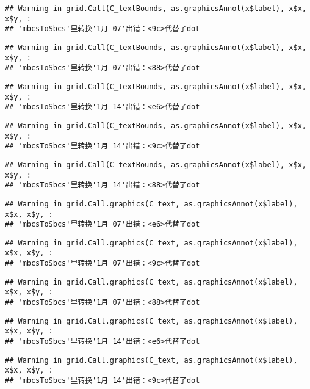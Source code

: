 \documentclass[
]{article}
\begin{document}
\begin{verbatim}
## Warning in grid.Call(C_textBounds, as.graphicsAnnot(x$label), x$x, x$y, :
## 'mbcsToSbcs'里转换'1月 07'出错：<9c>代替了dot
\end{verbatim}

\begin{verbatim}
## Warning in grid.Call(C_textBounds, as.graphicsAnnot(x$label), x$x, x$y, :
## 'mbcsToSbcs'里转换'1月 07'出错：<88>代替了dot
\end{verbatim}

\begin{verbatim}
## Warning in grid.Call(C_textBounds, as.graphicsAnnot(x$label), x$x, x$y, :
## 'mbcsToSbcs'里转换'1月 14'出错：<e6>代替了dot
\end{verbatim}

\begin{verbatim}
## Warning in grid.Call(C_textBounds, as.graphicsAnnot(x$label), x$x, x$y, :
## 'mbcsToSbcs'里转换'1月 14'出错：<9c>代替了dot
\end{verbatim}

\begin{verbatim}
## Warning in grid.Call(C_textBounds, as.graphicsAnnot(x$label), x$x, x$y, :
## 'mbcsToSbcs'里转换'1月 14'出错：<88>代替了dot
\end{verbatim}

\begin{verbatim}
## Warning in grid.Call.graphics(C_text, as.graphicsAnnot(x$label), x$x, x$y, :
## 'mbcsToSbcs'里转换'1月 07'出错：<e6>代替了dot
\end{verbatim}

\begin{verbatim}
## Warning in grid.Call.graphics(C_text, as.graphicsAnnot(x$label), x$x, x$y, :
## 'mbcsToSbcs'里转换'1月 07'出错：<9c>代替了dot
\end{verbatim}

\begin{verbatim}
## Warning in grid.Call.graphics(C_text, as.graphicsAnnot(x$label), x$x, x$y, :
## 'mbcsToSbcs'里转换'1月 07'出错：<88>代替了dot
\end{verbatim}

\begin{verbatim}
## Warning in grid.Call.graphics(C_text, as.graphicsAnnot(x$label), x$x, x$y, :
## 'mbcsToSbcs'里转换'1月 14'出错：<e6>代替了dot
\end{verbatim}

\begin{verbatim}
## Warning in grid.Call.graphics(C_text, as.graphicsAnnot(x$label), x$x, x$y, :
## 'mbcsToSbcs'里转换'1月 14'出错：<9c>代替了dot
\end{verbatim}
\end{document}
